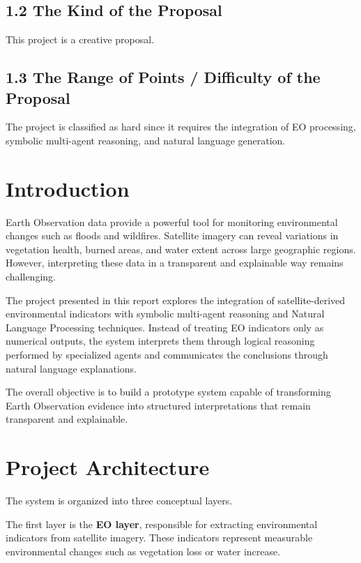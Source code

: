 \documentclass[11pt,a4paper]{article}
\begin{document}
\subsection*{1.2 The Kind of the Proposal}

This project is a creative proposal.

\subsection*{1.3 The Range of Points / Difficulty of the Proposal}

The project is classified as hard since it requires the integration of EO processing, symbolic multi-agent reasoning, and natural language generation.

\newpage

\section{Introduction}

Earth Observation data provide a powerful tool for monitoring environmental changes such as floods and wildfires. Satellite imagery can reveal variations in vegetation health, burned areas, and water extent across large geographic regions. However, interpreting these data in a transparent and explainable way remains challenging.

The project presented in this report explores the integration of satellite-derived environmental indicators with symbolic multi-agent reasoning and Natural Language Processing techniques. Instead of treating EO indicators only as numerical outputs, the system interprets them through logical reasoning performed by specialized agents and communicates the conclusions through natural language explanations.

The overall objective is to build a prototype system capable of transforming Earth Observation evidence into structured interpretations that remain transparent and explainable.

\section{Project Architecture}

The system is organized into three conceptual layers.

The first layer is the \textbf{EO layer}, responsible for extracting environmental indicators from satellite imagery. These indicators represent measurable environmental changes such as vegetation loss or water increase.
\end{document}

